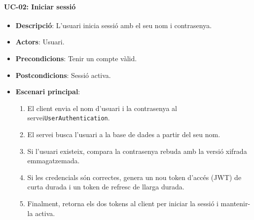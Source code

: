 \paragraph{UC-02: Iniciar sessi\'o}
\begin{itemize}
  \item \textbf{Descripció}: L'usuari inicia sessió amb el seu nom i contrasenya.
  \item \textbf{Actors}: Usuari.
  \item \textbf{Precondicions}: Tenir un compte vàlid.
  \item \textbf{Postcondicions}: Sessió activa.
  \item \textbf{Escenari principal}:
    \begin{enumerate}
        \item El client envia el nom d'usuari i la contrasenya al servei\texttt{UserAuthentication}.
        \item El servei busca l'usuari a la base de dades a partir del seu nom.
        \item Si l'usuari existeix, compara la contrasenya rebuda amb la versió xifrada emmagatzemada.
        \item Si les credencials són correctes, genera un nou token d'accés (JWT) de curta durada i un token de refresc de llarga durada.
        \item Finalment, retorna els dos tokens al client per iniciar la sessió i mantenir-la activa.
    \end{enumerate}
\end{itemize}

